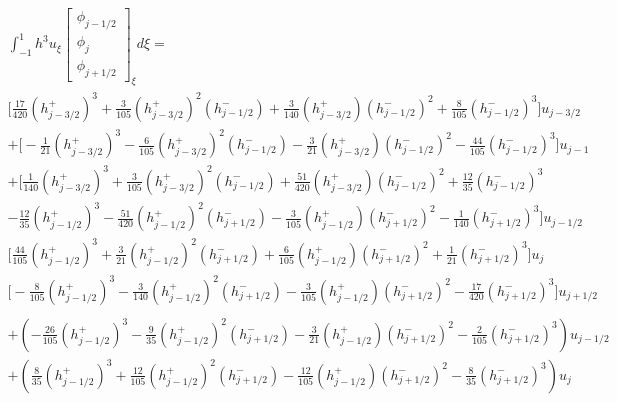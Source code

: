 \documentclass[12pt]{article}
\begin{document}
\begin{multline*}
\int_{-1}^{1}h^3u_{\xi}\left[\begin{array}{c}\phi_{j-1/2} \\\phi_{j}\\\phi_{j+1/2} \end{array}\right]_\xi d\xi = \\
\bigg[\frac{17}{420}\left(h^+_{j - 3/2}\right)^3 +  \frac{3}{105} \left(h^+_{j - 3/2}\right)^2 \left(h^-_{j - 1/2}\right)
+ \frac{3}{140} \left(h^+_{j - 3/2}\right) \left(h^-_{j - 1/2}\right)^2 +  \frac{8}{105}\left(h^-_{j - 1/2}\right)^3  \bigg] u_{j - 3/2} \\
+ \bigg[-\frac{1}{21}\left(h^+_{j - 3/2}\right)^3 - \frac{6}{105} \left(h^+_{j - 3/2}\right)^2 \left(h^-_{j - 1/2}\right)
-  \frac{3}{21} \left(h^+_{j - 3/2}\right) \left(h^-_{j - 1/2}\right)^2 - \frac{44}{105}  \left(h^-_{j - 1/2}\right)^3 \bigg] u_{j - 1} \\
+ \bigg[\frac{1}{140}\left(h^+_{j - 3/2}\right)^3 +  \frac{3}{105} \left(h^+_{j - 3/2}\right)^2 \left(h^-_{j - 1/2}\right)
+  \frac{51}{420} \left(h^+_{j - 3/2}\right) \left(h^-_{j - 1/2}\right)^2 +  \frac{12}{35} \left(h^-_{j - 1/2}\right)^3 \\ - \frac{12}{35} \left(h^+_{j - 1/2} \right)^3 - \frac{51}{420}  \left(h^+_{j - 1/2} \right)^2\left(h^-_{j + 1/2}\right) - \frac{3}{105} \left(h^+_{j - 1/2} \right)\left(h^-_{j + 1/2}\right)^2 - \frac{1}{140} \left(h^-_{j + 1/2}\right)^3 \bigg] u_{j - 1/2} \\
\bigg[\frac{44}{105}\left(h^+_{j - 1/2} \right)^3 +  \frac{3}{21}\left(h^+_{j - 1/2} \right)^2\left(h^-_{j + 1/2}\right) +  \frac{6}{105} \left(h^+_{j - 1/2} \right)\left(h^-_{j + 1/2}\right)^2 + \frac{1}{21}\left(h^-_{j + 1/2}\right)^3 \bigg] u_{j}\\
\bigg[ - \frac{8}{105}\left(h^+_{j - 1/2} \right)^3 - \frac{3}{140}  \left(h^+_{j - 1/2} \right)^2\left(h^-_{j + 1/2}\right) - \frac{3}{105} \left(h^+_{j - 1/2} \right)\left(h^-_{j + 1/2}\right)^2  - \frac{17}{420} \left(h^-_{j + 1/2}\right)^3 \bigg] u_{j + 1/2}\\\\
+\left(-\frac{26}{105}\left(h^+_{j - 1/2} \right)^3  -\frac{9}{35} \left(h^+_{j - 1/2} \right)^2\left(h^-_{j + 1/2}\right) -\frac{3}{21} \left(h^+_{j - 1/2} \right)\left(h^-_{j + 1/2}\right)^2 -\frac{2}{105} \left(h^-_{j + 1/2}\right)^3\right)u_{j- 1/2}\\
+ \left( \frac{8}{35}\left(h^+_{j - 1/2} \right)^3 + \frac{12}{105} \left(h^+_{j - 1/2} \right)^2\left(h^-_{j + 1/2}\right) - \frac{12}{105} \left(h^+_{j - 1/2} \right)\left(h^-_{j + 1/2}\right)^2  - \frac{8}{35}\left(h^-_{j + 1/2}\right)^3\right)u_{j}\\

\end{multline*}
\end{document}
